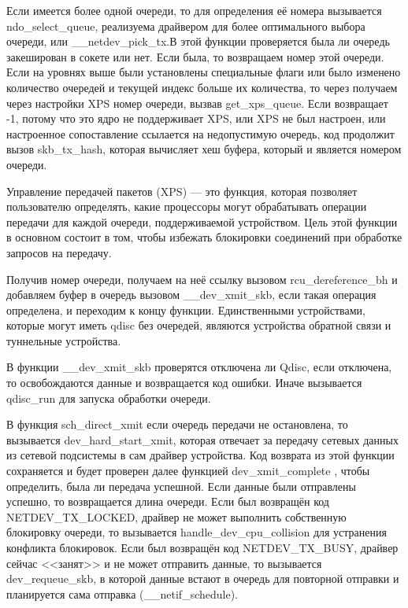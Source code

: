 Если имеется более одной очереди, то для определения её номера вызывается ndo\_select\_queue, реализуема драйвером для более оптимального выбора очереди, или \_\_netdev\_pick\_tx.В этой функции проверяется была ли очередь закеширован в сокете или нет. Если была, то возвращаем номер этой очереди. Если на уровнях выше были установлены специальные флаги или было изменено количество очередей и текущей индекс больше их количества, то через получаем через настройки XPS номер очереди, вызвав get\_xps\_queue. Если возвращает  -1, потому что это ядро не поддерживает XPS, или XPS не был настроен, или настроенное сопоставление ссылается на недопустимую очередь, код продолжит вызов skb\_tx\_hash, которая вычисляет хеш буфера, который и является номером очереди.

Управление передачей пакетов (XPS) --- это функция, которая позволяет пользователю определять, какие процессоры могут обрабатывать операции передачи для каждой очереди, поддерживаемой устройством. Цель этой функции в основном состоит в том, чтобы избежать блокировки соединений при обработке запросов на передачу.

Получив номер очереди, получаем на неё ссылку вызовом rcu\_dereference\_bh и добавляем буфер в очередь вызовом \_\_dev\_xmit\_skb, если такая операция определена, и переходим к концу функции. Единственными устройствами, которые могут иметь qdisc без очередей, являются устройства обратной связи и туннельные устройства.

В функции \_\_dev\_xmit\_skb проверятся отключена ли Qdisc, если отключена, то освобождаются данные и возвращается код ошибки. Иначе вызывается qdisc\_run для запуска обработки очереди.

В функция sch\_direct\_xmit если очередь передачи не остановлена, то вызывается dev\_hard\_start\_xmit, которая отвечает за передачу сетевых данных из сетевой подсистемы в сам драйвер устройства. Код возврата из этой функции сохраняется и будет проверен далее функцией dev\_xmit\_complete , чтобы определить, была ли передача успешной. Если данные были отправлены успешно, то возвращается длина очереди. Если был возвращён код NETDEV\_TX\_LOCKED, драйвер не может выполнить собственную блокировку очереди, то вызывается handle\_dev\_cpu\_collision для устранения конфликта блокировок. Если был возвращён код NETDEV\_TX\_BUSY, драйвер сейчас <<занят>> и не может отправить данные, то вызывается dev\_requeue\_skb, в которой данные встают в очередь для повторной отправки и планируется сама отправка (\_\_netif\_schedule).

